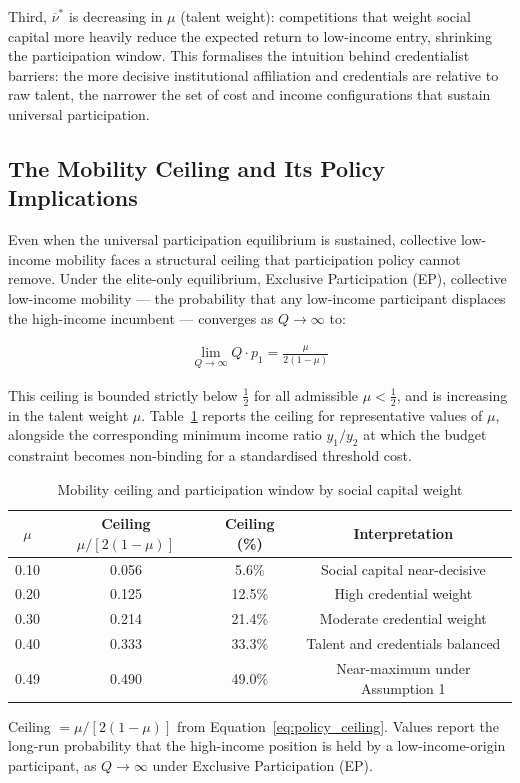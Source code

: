 \documentclass[
    oneside,
    fontsize=10pt,leqno]{article}
\begin{document}
Third, $\overline{\nu}^*$ is decreasing in $\mu$ (talent weight): competitions
that weight social capital more heavily reduce the expected return
to low-income entry, shrinking the participation window. This
formalises the intuition behind credentialist barriers: the more
decisive institutional affiliation and credentials are relative to
raw talent, the narrower the set of cost and income configurations
that sustain universal participation.

\subsection{\label{subsec:Ceiling}The Mobility Ceiling and Its Policy Implications}

Even when the universal participation equilibrium is sustained,
collective low-income mobility faces a structural ceiling that
participation policy cannot remove. Under the elite-only equilibrium,
Exclusive Participation (EP), collective low-income mobility --- the probability that
any low-income participant displaces the high-income incumbent ---
converges as $Q\to\infty$ to:

\begin{align}
\lim_{Q\to\infty} Q \cdot p_1 = \frac{\mu}{2(1-\mu)}
\label{eq:policy_ceiling}
\end{align}

\noindent This ceiling is bounded strictly below $\tfrac{1}{2}$ for
all admissible $\mu < \tfrac{1}{2}$, and is increasing in the talent weight $\mu$.
Table~\ref{tab:ceiling_values} reports the ceiling for representative
values of $\mu$, alongside the corresponding minimum income ratio
$y_1/y_2$ at which the budget constraint becomes non-binding for a
standardised threshold cost.

\begin{table}[H]
\centering
\caption{\label{tab:ceiling_values}Mobility ceiling and participation
window by social capital weight}
\smallskip
\begin{tabular}{cccc}
\toprule
$\mu$ & Ceiling $\mu/[2(1-\mu)]$
      & Ceiling (\%) & Interpretation \\
\midrule
0.10  & 0.056 & 5.6\%  & Social capital near-decisive \\
0.20  & 0.125 & 12.5\% & High credential weight \\
0.30  & 0.214 & 21.4\% & Moderate credential weight \\
0.40  & 0.333 & 33.3\% & Talent and credentials balanced \\
0.49  & 0.490 & 49.0\% & Near-maximum under Assumption 1 \\
\bottomrule
\end{tabular}
\begin{minipage}{\textwidth}
\smallskip
{\footnotesize Ceiling $= \mu/[2(1-\mu)]$ from
Equation~\eqref{eq:policy_ceiling}. Values report the long-run
probability that the high-income position is held by a
low-income-origin participant, as $Q\to\infty$ under Exclusive Participation (EP).}
\end{minipage}
\end{table}
\end{document}
